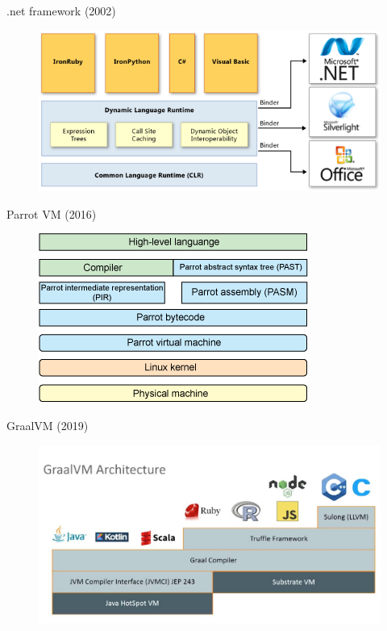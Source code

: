 \documentclass[aspectratio=169]{beamer}
\begin{document}
\begin{frame}{.net framework (2002)}

	\begin{figure}
    			\centering
    			\includegraphics[width=\linewidth]{Images/netpoly}
    			\end{figure}

\end{frame}

\begin{frame}{Parrot VM (2016)}

	\begin{figure}
    			\centering
    			\includegraphics[width=0.6\linewidth]{Images/parrot}
    \end{figure}

\end{frame}

\begin{frame}{GraalVM (2019)}

	\begin{figure}
		\centering
		\includegraphics[width=\linewidth]{Images/graalvm}
	\end{figure}

\end{frame}
\end{document}
